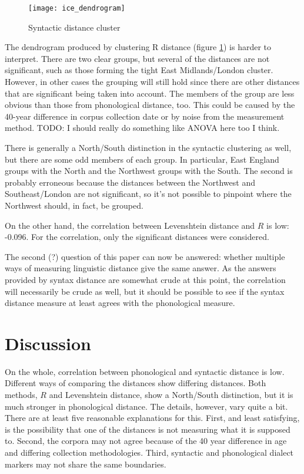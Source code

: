 \documentclass[11pt]{article}
\begin{document}
\begin{figure}
  \texttt{[image: ice\_dendrogram]}
\caption{Syntactic distance cluster}
\label{syntax-dendrogram}
\end{figure}

The dendrogram produced by clustering R distance (figure
\ref{syntax-dendrogram}) is harder to
interpret. There are two clear groups, but several of the distances
are not significant, such as those forming the tight East
Midlands/London cluster. However, in other cases the grouping will still hold
since there are other distances that are significant being taken into
account. The members of the group are less obvious than those from
phonological distance, too. This could be caused by the 40-year
difference in corpus collection date or by noise from the measurement
method.
TODO: I should really do something like ANOVA here too I think.

There is generally a North/South distinction in the syntactic
clustering as well, but there are some odd members of each group. In
particular, East England groups with the North and the Northwest
groups with the South. The second is probably erroneous because the
distances between the Northwest and Southeast/London are not
significant, so it's not possible to pinpoint where the Northwest
should, in fact, be grouped.

On the other hand, the correlation between Levenshtein distance and
$R$ is low: -0.096. For the correlation, only the significant
distances were considered.

The second (?) question of this paper can now be answered: whether
multiple ways of measuring linguistic distance give the same
answer. As the answers provided by syntax distance are somewhat crude
at this point, the correlation will necessarily be crude as well, but
it should be possible to see if the syntax distance measure at least
agrees with the phonological measure.


\section{Discussion}

On the whole, correlation between phonological and syntactic distance
is low. Different ways of comparing the distances show differing
distances. Both methods, $R$ and Levenshtein distance, show a
North/South distinction, but it is much stronger in phonological
distance. The details, however, vary quite a bit. There are at least
five reasonable
explanations for this. First, and least satisfying, is the possibility
that one of the distances is not measuring what it is supposed
to. Second, the corpora may not agree because of the 40 year
difference in age and differing collection methodologies. Third,
syntactic and phonological dialect markers may not share the same
boundaries.
\end{document}
